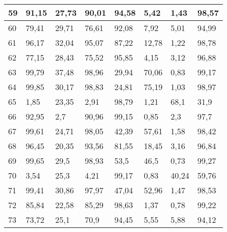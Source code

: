 \begin{longtable}[c]{|l|l|l|l|l|l|l|l|}
59              & 91,15        & 27,73        & 90,01       & 94,58         & 5,42          & 1,43          & 98,57         \\ \hline
60              & 79,41        & 29,71        & 76,61       & 92,08         & 7,92          & 5,01          & 94,99         \\ \hline
61              & 96,17        & 32,04        & 95,07       & 87,22         & 12,78         & 1,22          & 98,78         \\ \hline
62              & 77,15        & 28,43        & 75,52       & 95,85         & 4,15          & 3,12          & 96,88         \\ \hline
63              & 99,79        & 37,48        & 98,96       & 29,94         & 70,06         & 0,83          & 99,17         \\ \hline
64              & 99,85        & 30,17        & 98,83       & 24,81         & 75,19         & 1,03          & 98,97         \\ \hline
65              & 1,85         & 23,35        & 2,91        & 98,79         & 1,21          & 68,1          & 31,9          \\ \hline
66              & 92,95        & 2,7          & 90,96       & 99,15         & 0,85          & 2,3           & 97,7          \\ \hline
67              & 99,61        & 24,71        & 98,05       & 42,39         & 57,61         & 1,58          & 98,42         \\ \hline
68              & 96,45        & 20,35        & 93,56       & 81,55         & 18,45         & 3,16          & 96,84         \\ \hline
69              & 99,65        & 29,5         & 98,93       & 53,5          & 46,5          & 0,73          & 99,27         \\ \hline
70              & 3,54         & 25,3         & 4,21        & 99,17         & 0,83          & 40,24         & 59,76         \\ \hline
71              & 99,41        & 30,86        & 97,97       & 47,04         & 52,96         & 1,47          & 98,53         \\ \hline
72              & 85,84        & 22,58        & 85,29       & 98,63         & 1,37          & 0,78          & 99,22         \\ \hline
73              & 73,72        & 25,1         & 70,9        & 94,45         & 5,55          & 5,88          & 94,12         \\ \hline

\end{longtable}
